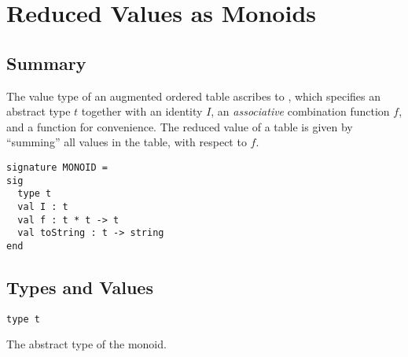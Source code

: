 \section{Reduced Values as Monoids}
\label{sec:aug-ordtable-interface::reduced-values-as-monoids}


\subsection{Summary}
\label{sec:aug-ordtable-interface::monoid}

\begin{cluster}
\label{grp:grm:aug-ordtable-interface::value}

\begin{gram}
\label{grm:aug-ordtable-interface::value}
The value type of an augmented ordered table ascribes to , which
specifies an abstract type $t$ together with an identity $I$, an
\emph{associative} combination function $f$, and a  function for
convenience. The reduced value of a table is given by ``summing'' all values in
the table, with respect to $f$.

\end{gram}
\end{cluster}

\begin{cluster}
\label{grp:gr:aug-ordtable-interface:MONOID}

\begin{gram}[MONOID]
\label{gr:aug-ordtable-interface:MONOID}
\begin{verbatim}
signature MONOID =
sig
  type t
  val I : t
  val f : t * t -> t
  val toString : t -> string
end
\end{verbatim}

\end{gram}
\end{cluster}


\subsection{Types and Values}
\label{sec:aug-ordtable-interface::types-and-values}

\begin{cluster}
\label{grp:grm:aug-ordtable-interface::abstract}

\begin{gram}
\label{grm:aug-ordtable-interface::abstract}
\begin{verbatim}
type t
\end{verbatim}
The abstract type of the monoid.

\end{gram}
\end{cluster}

